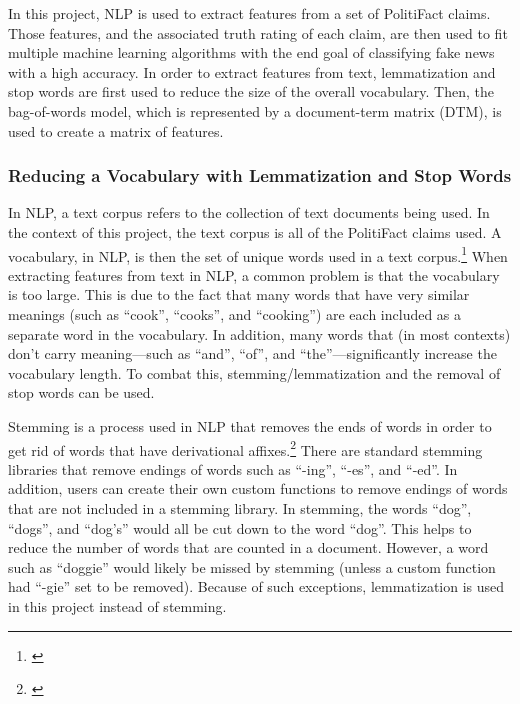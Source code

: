 \documentclass[12pt]{article}
\begin{document}
In this project, NLP is used to extract features from a set of
PolitiFact claims. Those features, and the associated truth rating of
each claim, are then used to fit multiple machine learning algorithms
with the end goal of classifying fake news with a high accuracy. In
order to extract features from text, lemmatization and stop words are
first used to reduce the size of the overall vocabulary. Then, the
bag-of-words model, which is represented by a document-term matrix
(DTM), is used to create a matrix of features.

\hypertarget{reducing-a-vocabulary-with-lemmatization-and-stop-words}{%
\subsubsection{Reducing a Vocabulary with Lemmatization and Stop
Words}\label{reducing-a-vocabulary-with-lemmatization-and-stop-words}}

In NLP, a text corpus refers to the collection of text documents being
used. In the context of this project, the text corpus is all of the
PolitiFact claims used. A vocabulary, in NLP, is then the set of unique
words used in a text corpus.\footnote{\citet{VocabularyNaturalLanguage}}
When extracting features from text in NLP, a common problem is that the
vocabulary is too large. This is due to the fact that many words that
have very similar meanings (such as ``cook'', ``cooks'', and
``cooking'') are each included as a separate word in the vocabulary. In
addition, many words that (in most contexts) don't carry meaning---such
as ``and'', ``of'', and ``the''---significantly increase the vocabulary
length. To combat this, stemming/lemmatization and the removal of stop
words can be used.

Stemming is a process used in NLP that removes the ends of words in
order to get rid of words that have derivational affixes.\footnote{\citet{StemmingLemmatization}}
There are standard stemming libraries that remove endings of words such
as ``-ing'', ``-es'', and ``-ed''. In addition, users can create their
own custom functions to remove endings of words that are not included in
a stemming library. In stemming, the words ``dog'', ``dogs'', and
``dog's'' would all be cut down to the word ``dog''. This helps to
reduce the number of words that are counted in a document. However, a
word such as ``doggie'' would likely be missed by stemming (unless a
custom function had ``-gie'' set to be removed). Because of such
exceptions, lemmatization is used in this project instead of stemming.
\end{document}

